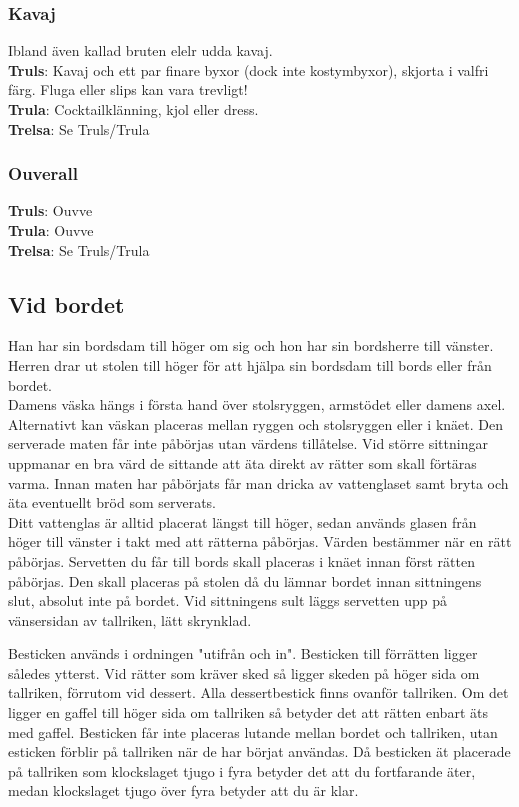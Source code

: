 \subsubsection*{Kavaj}
Ibland även kallad bruten elelr udda kavaj.\\
\textbf{Truls}: Kavaj och ett par finare byxor (dock inte kostymbyxor), skjorta i valfri färg. Fluga eller slips kan vara trevligt!\\
\textbf{Trula}: Cocktailklänning, kjol eller dress.\\
\textbf{Trelsa}: Se Truls/Trula

\subsubsection*{Ouverall}
\textbf{Truls}: Ouvve\\
\textbf{Trula}: Ouvve\\
\textbf{Trelsa}: Se Truls/Trula


\newpage


\subsection*{Vid bordet}
Han har sin bordsdam till höger om sig och hon har sin bordsherre till vänster.
Herren drar ut stolen till höger för att hjälpa sin bordsdam till bords eller från bordet.
\\

Damens väska hängs i första hand över stolsryggen, armstödet eller damens axel.
Alternativt kan väskan placeras mellan ryggen och stolsryggen eller i knäet.
Den serverade maten får inte påbörjas utan värdens tillåtelse.
Vid större sittningar uppmanar en bra värd de sittande att äta direkt av rätter som skall förtäras varma.
Innan maten har påbörjats får man dricka av vattenglaset samt bryta och äta eventuellt bröd som serverats.
\\

Ditt vattenglas är alltid placerat längst till höger, sedan används glasen från höger till vänster i takt med att rätterna påbörjas.
Värden bestämmer när en rätt påbörjas.
Servetten du får till bords skall placeras i knäet innan först rätten påbörjas. Den skall placeras på stolen då du lämnar bordet innan sittningens slut, absolut inte på bordet.
Vid sittningens sult läggs servetten upp på vänsersidan av tallriken, lätt skrynklad.
\\

\newpage

Besticken används i ordningen "utifrån och in".
Besticken till förrätten ligger således ytterst.
Vid rätter som kräver sked så ligger skeden på höger sida om tallriken, förrutom vid dessert.
Alla dessertbestick finns ovanför tallriken.
Om det ligger en gaffel till höger sida om tallriken så betyder det att rätten enbart äts med gaffel.
Besticken får inte placeras lutande mellan bordet och tallriken, utan esticken förblir på tallriken när de har börjat användas. 
Då besticken ät placerade på tallriken som klockslaget tjugo i fyra betyder det att du fortfarande äter,
medan klockslaget tjugo över fyra betyder att du är klar.
\\

